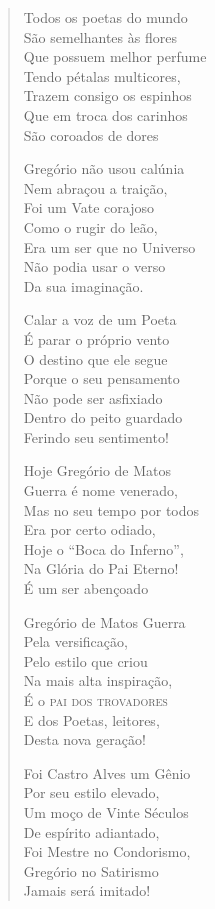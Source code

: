 \begin{verse}
Todos os poetas do mundo \\
São semelhantes às flores \\
Que possuem melhor perfume \\
Tendo pétalas multicores, \\
Trazem consigo os espinhos \\
Que em troca dos carinhos \\
São coroados de dores 

Gregório não usou calúnia \\
Nem abraçou a traição, \\
Foi um Vate corajoso \\
Como o rugir do leão, \\
Era um ser que no Universo \\
Não podia usar o verso \\
Da sua imaginação. 

Calar a voz de um Poeta \\
É parar o próprio vento \\
O destino que ele segue \\
Porque o seu pensamento \\
Não pode ser asfixiado \\
Dentro do peito guardado \\
Ferindo seu sentimento! 
\pagebreak

Hoje Gregório de Matos \\
Guerra é nome venerado, \\
Mas no seu tempo por todos \\
Era por certo odiado, \\
Hoje o ``Boca do Inferno'', \\
Na Glória do Pai Eterno! \\
É um ser abençoado 

Gregório de Matos Guerra \\
Pela versificação, \\
Pelo estilo que criou \\
Na mais alta inspiração, \\
É o \textsc{pai dos trovadores} \\
E dos Poetas, leitores, \\
Desta nova geração! 

Foi Castro Alves um Gênio \\
Por seu estilo elevado, \\
Um moço de Vinte Séculos \\
De espírito adiantado, \\
Foi Mestre no Condorismo, \\
Gregório no Satirismo \\
Jamais será imitado! 


\end{verse}
